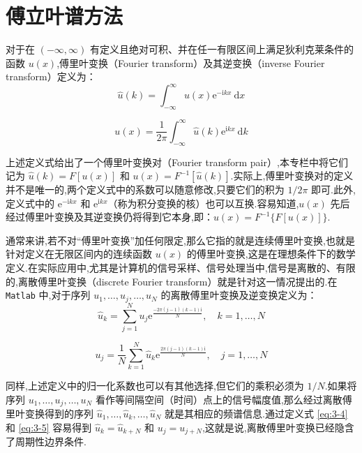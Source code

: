 \section{傅立叶谱方法}

对于在 $(-\infty, \infty)$ 有定义且绝对可积、并在任一有限区间上满足狄利克莱条件的函数 $u(x)$,傅里叶变换（Fourier transform）及其逆变换（inverse Fourier transform）定义为：
\begin{equation}
    \hat{u}(k) = \int_{-\infty}^{\infty} u(x) \mathrm{e}^{-\mathrm{i} k x} \mathrm{~d} x \label{eq:3-1}
\end{equation}

\begin{equation}
    u(x) = \frac{1}{2 \pi} \int_{-\infty}^{\infty} \hat{u}(k) \mathrm{e}^{\mathrm{i} k x} \mathrm{~d} k \label{eq:3-2}
\end{equation}

上述定义式给出了一个傅里叶变换对（Fourier transform pair）,本专栏中将它们记为 $\hat{u}(k) = F[u(x)]$ 和 $u(x) = F^{-1}[\hat{u}(k)]$.实际上,傅里叶变换对的定义并不是唯一的,两个定义式中的系数可以随意修改,只要它们的积为 $1 / 2 \pi$ 即可.此外,定义式中的 $\mathrm{e}^{-\mathrm{i} k x}$ 和 $\mathrm{e}^{\mathrm{i} k x}$（称为积分变换的核）也可以互换.容易知道,$u(x)$ 先后经过傅里叶变换及其逆变换仍将得到它本身,即：$u(x) = F^{-1}\{F[u(x)]\}$.

通常来讲,若不对“傅里叶变换”加任何限定,那么它指的就是连续傅里叶变换,也就是针对定义在无限区间内的连续函数 $u(x)$ 的傅里叶变换,这是在理想条件下的数学定义.在实际应用中,尤其是计算机的信号采样、信号处理当中,信号是离散的、有限的,离散傅里叶变换（discrete Fourier transform）就是针对这一情况提出的.在 \texttt{Matlab} 中,对于序列 $u_1, \ldots, u_j, \ldots, u_N$ 的离散傅里叶变换及逆变换定义为：
\begin{equation}
    \hat{u}_k = \sum_{j=1}^N u_j \mathrm{e}^{\frac{-2 \pi(j-1)(k-1) \mathrm{i}}{N}}, \quad k=1, \ldots, N \label{eq:3-4}
\end{equation}

\begin{equation}
    u_j = \frac{1}{N} \sum_{k=1}^N \hat{u}_k \mathrm{e}^{\frac{2 \pi(j-1)(k-1) \mathrm{i}}{N}}, \quad j=1, \ldots, N \label{eq:3-5}
\end{equation}

同样,上述定义中的归一化系数也可以有其他选择,但它们的乘积必须为 $1 / N$.如果将序列 $u_1, \ldots, u_j, \ldots, u_N$ 看作等间隔空间（时间）点上的信号幅度值,那么经过离散傅里叶变换得到的序列 $\hat{u}_1, \ldots, \hat{u}_k, \ldots, \hat{u}_N$ 就是其相应的频谱信息.通过定义式 \eqref{eq:3-4} 和 \eqref{eq:3-5} 容易得到 $\hat{u}_k = \hat{u}_{k+N}$ 和 $u_j = u_{j+N}$,这就是说,离散傅里叶变换已经隐含了周期性边界条件.

